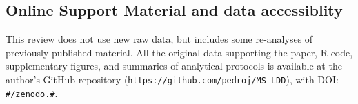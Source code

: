 \documentclass[a4paper, 12pt]{article}
\begin{document}
\begin{linenumbers}
\section*{Online Support Material and data accessiblity}

This review does not use new raw data, but includes some re-analyses of previously published material. All the original data supporting the paper, R code, supplementary figures, and summaries of analytical protocols is available at the author's GitHub repository (\texttt{https://github.com/pedroj/MS\_LDD}), with DOI: \texttt{\#/zenodo.\#}.

\end{linenumbers}

\end{document}
